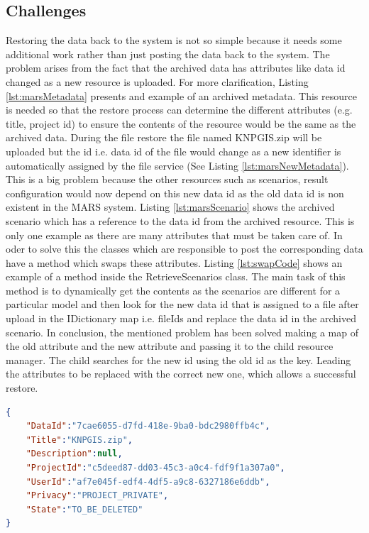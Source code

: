 \subsection{Challenges}
\label{subsec:restoreProb}
Restoring the data back to the system is not so simple because it needs some additional work rather than just posting the data back to the system. 
The problem arises from the fact that the archived data has attributes like data id changed as a new resource is uploaded. For more clarification, 
Listing \ref{lst:marsMetadata} presents and example of an archived metadata. This resource is needed so that the restore process can determine the different 
attributes (e.g. title, project id) to ensure the contents of the resource would be the same as the archived data. During the file restore 
the file named KNPGIS.zip will 
be uploaded but the id i.e. data id of the file would change as a new identifier is automatically assigned by the file service (See Listing \ref{lst:marsNewMetadata}). 
This is a big problem because the other 
resources such as scenarios, result configuration would now
depend on this new data id as the old data id is non existent in the MARS system. Listing \ref{lst:marsScenario} shows the archived scenario which has a reference 
to the data id from the archived resource. 
This is only one example as there are many attributes that must be taken care of. In oder to solve this the classes which are responsible
to post the corresponding data have a method which swaps these attributes. Listing \ref{lst:swapCode} shows an example of a method inside the RetrieveScenarios class.
The main task of this method is to dynamically get the contents as the scenarios are different for a particular model and then look for the new data id
that is assigned to a file after upload in the IDictionary map i.e. fileIds and replace the data id in the archived scenario. In conclusion, the mentioned problem
has been solved making a map of the old attribute and the new attribute and passing it to the child resource manager. The child searches for the new id using the 
old id as the key. Leading the attributes to be replaced with the correct new one, which allows a successful restore.

\newpage
\begin{lstlisting}[caption={Snippet of archived MARS metadata resource}, language=json,firstnumber=1, captionpos=b, label={lst:marsMetadata}]
{
    "DataId":"7cae6055-d7fd-418e-9ba0-bdc2980ffb4c",
    "Title":"KNPGIS.zip",
    "Description":null,
    "ProjectId":"c5deed87-dd03-45c3-a0c4-fdf9f1a307a0",
    "UserId":"af7e045f-edf4-4df5-a9c8-6327186e6ddb",
    "Privacy":"PROJECT_PRIVATE",
    "State":"TO_BE_DELETED"
}
\end{lstlisting}


